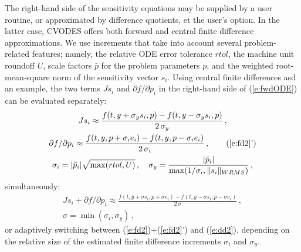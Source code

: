 The right-hand side of the sensitivity equations may be supplied by a 
user routine, or approximated by difference quotients, et the user's option.
In the latter case, CVODES offers both forward and central finite 
difference approximations. 
%
We use increments that take into account several problem-related features;
namely, the relative ODE error tolerance $rtol$, 
the machine unit roundoff $U$,
scale factors $\bar p$ for the problem parameters $p$, 
and the weighted root-mean-square norm of the sensitivity vector $s_i$.
%
Using central finite differences asd an example, the two terms $J s_i$ 
and ${\partial f}/{\partial p_i}$ in the right-hand side of (\ref{e:fwdODE}) 
can be evaluated separately:
\begin{gather}
  J s_i \approx \frac{f(t, y+\sigma_y s_i, p)-
    f(t, y-\sigma_y s_i, p)}{2\,\sigma_y} \, , \label{e:fd2} \\
  {\partial f}/{\partial p_i} \approx \frac{f(t,y,p + \sigma_i e_i)-
    f(t,y,p - \sigma_i e_i)}{2\,\sigma_i} \, , \tag{\ref{e:fd2}'} \\
  \sigma_i = |{\bar p}_i| \sqrt{\max(rtol, U)} \, , \quad
  \sigma_y = \frac{|{\bar p}_i|}{\max(1/\sigma_i, \|s_i\|_{WRMS})} \, \nonumber,
\end{gather}
simultaneously:
\begin{gather}
  J s_i + {\partial f}/{\partial p_i} \approx
  \frac{f(t, y+\sigma s_i, p + \sigma e_i) -
    f(t, y-\sigma s_i, p - \sigma e_i)}{2\,\sigma} \, , \label{e:dd2} \\
  \sigma = \min(\sigma_i, \sigma_y) \, , \nonumber
\end{gather}
or adaptively switching between (\ref{e:fd2})+(\ref{e:fd2}') and (\ref{e:dd2}), 
depending on the relative size of the estimated finite difference 
increments $\sigma_i$ and $\sigma_y$.

